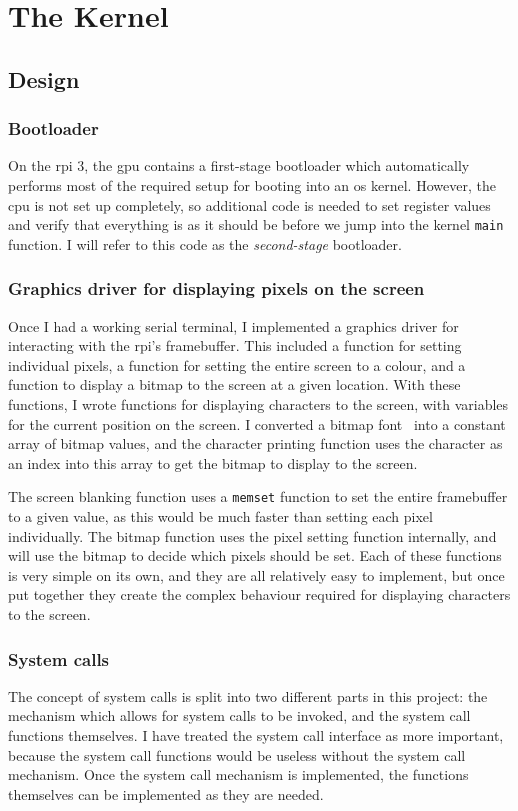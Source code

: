 \documentclass{article}
\begin{document}
\section{The Kernel}
\subsection{Design}
\label{sec:kernel_design}
\subsubsection{Bootloader}
On the \gls{rpi} 3, the \gls{gpu} contains a first-stage bootloader which
automatically performs most of the required setup for booting into an \gls{os}
kernel. However, the \gls{cpu} is not set up completely, so additional code is
needed to set register values and verify that everything is as it should be
before we jump into the kernel \texttt{main} function. I will refer to this
code as the \emph{second-stage} bootloader.

\subsubsection{Graphics driver for displaying pixels on the screen}
\label{sec:design_graphics_driver}
Once I had a working serial terminal, I implemented a graphics driver for
interacting with the \gls{rpi}'s framebuffer. This included a function for
setting individual pixels, a function for setting the entire screen to a
colour, and a function to display a bitmap to the screen at a given location.
With these functions, I wrote functions for displaying characters to the
screen, with variables for the current position on the screen. I converted a
bitmap font~\cite{bizcat-font} into a constant array of bitmap values, and the
character printing function uses the character as an index into this array to
get the bitmap to display to the screen.

The screen blanking function uses a \texttt{memset} function to set the entire
framebuffer to a given value, as this would be much faster than setting each
pixel individually. The bitmap function uses the pixel setting function
internally, and will use the bitmap to decide which pixels should be set. Each
of these functions is very simple on its own, and they are all relatively easy
to implement, but once put together they create the complex behaviour required
for displaying characters to the screen.

\subsubsection{System calls}
The concept of system calls is split into two different parts in this project:
the mechanism which allows for system calls to be invoked, and the system call
functions themselves. I have treated the system call interface as more
important, because the system call functions would be useless without the
system call mechanism. Once the system call mechanism is implemented, the
functions themselves can be implemented as they are needed.
\end{document}

